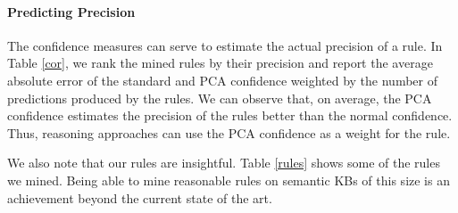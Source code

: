 \paragraph{Predicting Precision} 
The confidence measures can serve to estimate the actual precision of a rule.
In Table  \ref{cor}, we rank the mined rules by their precision and report the average absolute error of the standard and PCA confidence weighted by the number
of predictions produced by the rules. We can observe that, on average, the PCA confidence estimates the precision of the rules better than the normal confidence. 
Thus, reasoning approaches can use the PCA confidence as a weight for the rule.\\




We also note that our rules are insightful. Table \ref{rules} shows some of the rules we mined. Being able to mine reasonable rules on semantic KBs of this size is an achievement beyond the current state of the art.\\

